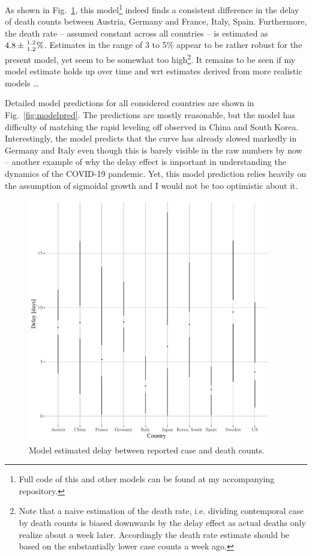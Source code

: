 \documentclass[a4paper]{tufte-handout}
\newcommand{\fig}[1]{Fig.~\ref{fig:#1}}
\begin{document}
As shown in \fig{taudie}, this model\footnote{Full code of this and
  other models can be found at my accompanying \href{Github}{\url{}}
  repository.} indeed finds a consistent difference in the delay of
death counts between Austria, Germany and France, Italy,
Spain. Furthermore, the death rate -- assumed constant across all
countries -- is estimated as $4.8 \pm {1.2 \atop 1.2} \%$. Estimates
in the range of 3 to 5\% appear to be rather robust for the present
model, yet seem to be somewhat too high\footnote{Note that a naive
  estimation of the death rate, i.e. dividing contemporal case by
  death counts is biased downwards by the delay effect as actual
  deaths only realize about a week later. Accordingly the death rate
  estimate should be based on the substantially lower case counts a
  week ago.}. It remains to be seen if my model estimate holds up over
time and wrt estimates derived from more realistic models \ldots

Detailed model predictions for all considered countries are shown in
\fig{modelpred}. The predictions are mostly reasonable, but the model
has difficulty of matching the rapid leveling off observed in China
and South Korea. Interestingly, the model predicts that the curve has
already slowed markedly in Germany and Italy even though this is
barely visible in the raw numbers by now -- another example of why the
delay effect is important in understanding the dynamics of the
COVID-19 pandemic. Yet, this model prediction relies heavily on the
assumption of sigmoidal growth and I would not be too optimistic about
it.

\begin{figure}
  \begin{center}
    \includegraphics[width=0.95\textwidth]{../figs/tau_die.pdf}
  \end{center}
  \caption{\label{fig:taudie} Model estimated delay between reported
    case and death counts.}
\end{figure}
\end{document}
